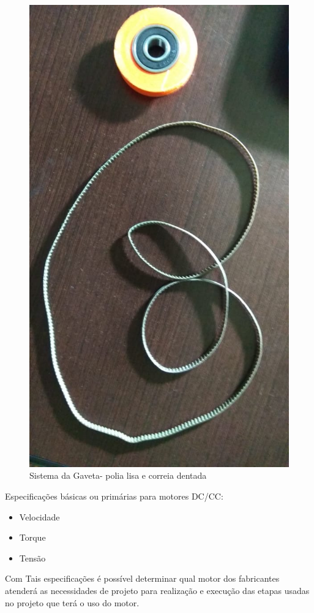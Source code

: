 \begin{figure}[!htb]
	\centering
	\includegraphics[scale=0.15]{figuras/3.jpeg} 
	\caption{Sistema da Gaveta- polia lisa e correia dentada}
	\label{Rotulo}
\end{figure}

\newpage

Especificações básicas ou primárias para motores DC/CC:

\begin{itemize}
	\item Velocidade
	\item Torque
	\item Tensão
\end{itemize}
Com Tais especificações é possível determinar qual motor dos fabricantes atenderá as necessidades de projeto para realização e execução das etapas usadas no projeto que terá o uso do motor. 

